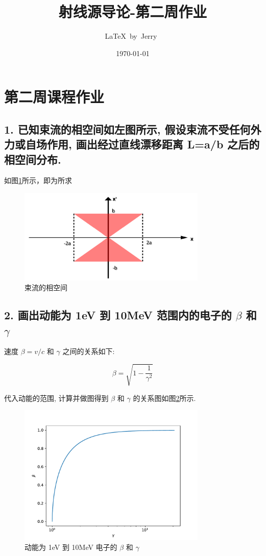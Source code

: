 \documentclass{article}
\title{射线源导论-第二周作业}
\author{\LaTeX\ by\ Jerry\ }
\date{\today}
\begin{document}
\pagestyle{fancy}

\fancyhead[R]{\today}

\section*{第二周课程作业}

\subsection*{1. 已知束流的相空间如左图所示, 假设束流不受任何外⼒或⾃场作⽤, 画出经过直线漂移距离 L=a/b 之后的相空间分布. }

如图\ref{fig:phase}所示，即为所求

\begin{figure}[ht]
    \centering
    \includegraphics[width=0.8\textwidth]{img/phase.png}
    \caption{束流的相空间}
    \label{fig:phase}
\end{figure}

\subsection*{2. 画出动能为 1eV 到 10MeV 范围内的电⼦的 $\beta$ 和 $\gamma$}

速度 $\beta = v/c$ 和 $\gamma$ 之间的关系如下:

$$\beta = \sqrt{1 - \frac{1}{\gamma^2}}$$

代入动能的范围, 计算并做图得到 $\beta$ 和 $\gamma$ 的关系图如图\ref{fig:beta_gamma}所示.

\begin{figure}[ht]
    \centering
    \includegraphics[width=0.8\textwidth]{img/beta_gamma.pdf}
    \caption{动能为 1eV 到 10MeV 电⼦的 $\beta$ 和 $\gamma$}
    \label{fig:beta_gamma}
\end{figure}
\end{document}
